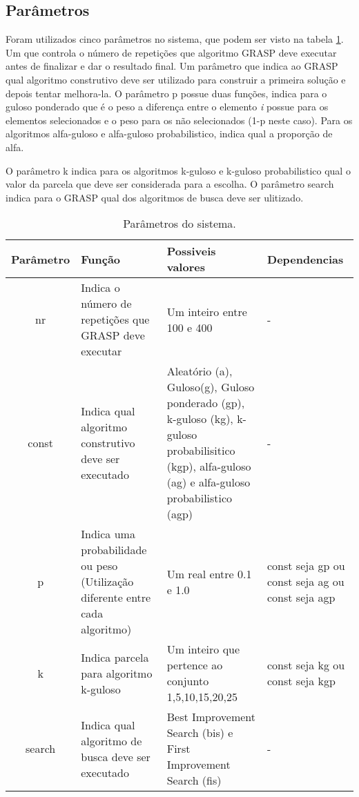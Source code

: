 \documentclass[12pt]{article}
\begin{document}
\subsection{Parâmetros}

Foram utilizados cinco parâmetros no sistema, que podem ser visto na tabela \ref{tabela_parametros}. Um que controla o número de repetições que algoritmo GRASP deve executar antes de finalizar e dar o resultado final. Um parâmetro que indica ao GRASP qual algoritmo construtivo deve ser utilizado para construir a primeira solução e depois tentar melhora-la. O parâmetro p possue duas funções, indica para o guloso ponderado que é o peso a diferença entre o elemento \textit{i} possue para os elementos selecionados e o peso para os não selecionados (1-p neste caso). Para os algoritmos alfa-guloso e alfa-guloso probabilistico, indica qual a proporção de alfa.

O parâmetro k indica para os algoritmos k-guloso e k-guloso probabilistico qual o valor da parcela que deve ser considerada para a escolha. O parâmetro search indica para o GRASP qual dos algoritmos de busca deve ser ulitizado.

\begin{table}[t]
	\centering
	\begin{tabular}{| c | p{3.5cm} | p{3.5cm} | p{3.5cm} | }
		\hline
		Parâmetro&Função&Possiveis valores&Dependencias\\ \hline
		nr&Indica o número de repetições que GRASP deve executar&Um inteiro entre 100 e 400&-\\ \hline
		const&Indica qual algoritmo construtivo deve ser executado&Aleatório (a), Guloso(g), Guloso ponderado (gp), k-guloso (kg), k-guloso probabilisitico (kgp), alfa-guloso (ag) e alfa-guloso probabilistico (agp)&-\\ \hline
		p&Indica uma probabilidade ou peso (Utilização diferente entre cada algoritmo)&Um real entre 0.1 e 1.0&const seja gp ou const seja ag ou const seja agp\\ \hline
		k&Indica parcela para algoritmo k-guloso&Um inteiro que pertence ao conjunto {1,5,10,15,20,25}&const seja kg ou const seja kgp\\ \hline
		search&Indica qual algoritmo de busca deve ser executado& Best Improvement Search (bis) e First Improvement Search (fis)&-\\ \hline
	\end{tabular}
	\caption{Parâmetros do sistema.}
	\label{tabela_parametros}
\end{table}
\end{document}
